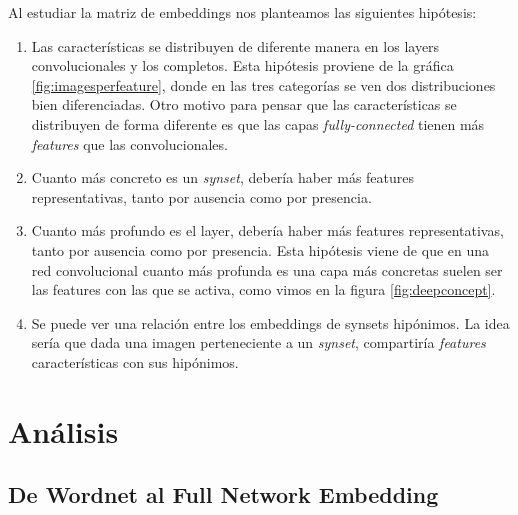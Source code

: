 \documentclass[12,twoside]{TFG-GM}
\theoremstyle{definition}
\theoremstyle{remark}
\begin{document}
Al estudiar la matriz de embeddings nos planteamos las siguientes hipótesis: 
\begin{enumerate}
\item \label{h1} Las características se distribuyen de diferente manera en los layers convolucionales y los completos. Esta hipótesis proviene de la gráfica \ref{fig:imagesperfeature}, donde 
en las tres categorías se ven dos distribuciones bien diferenciadas. Otro motivo para pensar que las características se distribuyen de forma diferente es que las capas \textit{fully-connected} tienen más \textit{features} que las convolucionales.
\item \label{h2} Cuanto más concreto es un \textit{synset}, debería haber más features representativas, tanto por ausencia como por presencia.
\item \label{h3} Cuanto más profundo es el layer, debería haber más features representativas, tanto por ausencia como por presencia. Esta hipótesis viene de que en una red convolucional cuanto más profunda es una capa más concretas suelen ser las features con las que se activa, como vimos en la figura \ref{fig:deepconcept}.
\item \label{h4} Se puede ver una relación entre los embeddings de synsets hipónimos. La idea sería que dada una imagen perteneciente a un \textit{synset}, compartiría \textit{features} características con sus hipónimos.
\end{enumerate}


\newpage
\section{Análisis}
\label{sec:analisis}
\subsection{De Wordnet al Full Network Embedding}
%
\end{document}
